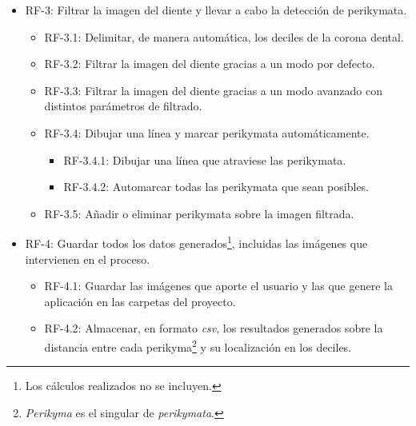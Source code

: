 \begin{itemize}
        \pagebreak        
        \item RF-3: Filtrar la imagen del diente y llevar a cabo la detección de perikymata.
            \begin{itemize}
                \item RF-3.1: Delimitar, de manera automática, los deciles de la corona dental.
                \item RF-3.2: Filtrar la imagen del diente gracias a un modo por defecto.
                \item RF-3.3: Filtrar la imagen del diente gracias a un modo avanzado con distintos parámetros de filtrado.
                \item RF-3.4: Dibujar una línea y marcar perikymata automáticamente.
                \begin{itemize}
                        \item RF-3.4.1: Dibujar una línea que atraviese las perikymata.
                        \item RF-3.4.2: Automarcar todas las perikymata que sean posibles. 
                \end{itemize}
                \item RF-3.5: Añadir o eliminar perikymata sobre la imagen filtrada.
            \end{itemize}        
        
        \item RF-4: Guardar todos los datos generados\footnote{Los cálculos realizados no se incluyen.}, incluidas las imágenes que intervienen en el proceso.
            \begin{itemize}
                \item RF-4.1: Guardar las imágenes que aporte el usuario y las que genere la aplicación en las carpetas del proyecto.
                \item RF-4.2: Almacenar, en formato \textit{csv}, los resultados generados sobre la distancia entre cada perikyma\footnote{\textit{Perikyma} es el singular de \textit{perikymata}.} y su localización en los deciles.
            \end{itemize}
            

\end{itemize}
